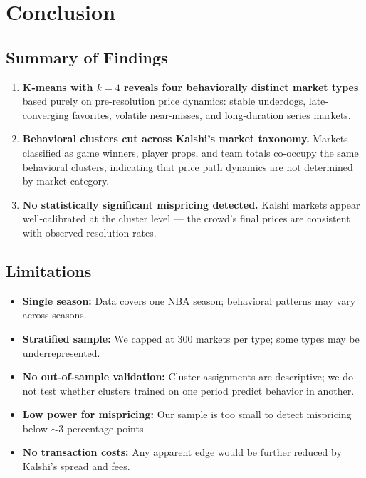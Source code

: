 \documentclass[11pt, a4paper]{article}
\begin{document}
\section{Conclusion}

\subsection{Summary of Findings}
\begin{enumerate}[noitemsep]
  \item \textbf{K-means with $k=4$ reveals four behaviorally distinct market types} based purely on pre-resolution price dynamics: stable underdogs, late-converging favorites, volatile near-misses, and long-duration series markets.
  \item \textbf{Behavioral clusters cut across Kalshi's market taxonomy.} Markets classified as game winners, player props, and team totals co-occupy the same behavioral clusters, indicating that price path dynamics are not determined by market category.
  \item \textbf{No statistically significant mispricing detected.} Kalshi markets appear well-calibrated at the cluster level — the crowd's final prices are consistent with observed resolution rates.
\end{enumerate}

\subsection{Limitations}
\begin{itemize}[noitemsep]
  \item \textbf{Single season:} Data covers one NBA season; behavioral patterns may vary across seasons.
  \item \textbf{Stratified sample:} We capped at 300 markets per type; some types may be underrepresented.
  \item \textbf{No out-of-sample validation:} Cluster assignments are descriptive; we do not test whether clusters trained on one period predict behavior in another.
  \item \textbf{Low power for mispricing:} Our sample is too small to detect mispricing below $\sim$3 percentage points.
  \item \textbf{No transaction costs:} Any apparent edge would be further reduced by Kalshi's spread and fees.
\end{itemize}
\end{document}
